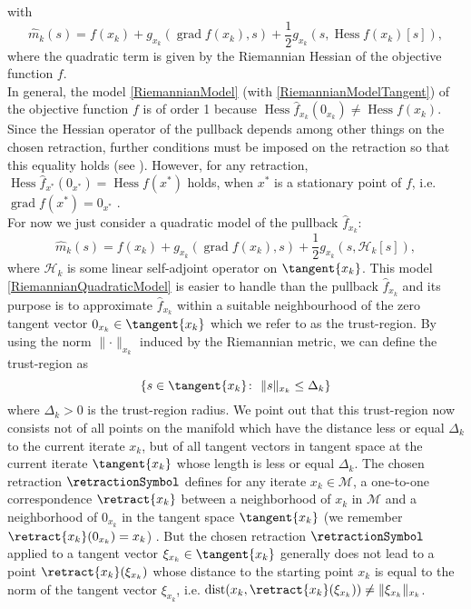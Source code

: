 with
\begin{equation}\label{RiemannianModelTangent}
    \hat{m}_k( s ) = f(x_k) + g_{x_k}(\operatorname{grad} f(x_k), s ) + \frac{1}{2} g_{x_k}( s, \operatorname{Hess} f(x_k) [s]),
\end{equation}
where the quadratic term is given by the Riemannian Hessian of the objective function $f$. \\
In general, the model \cref{RiemannianModel} (with \cref{RiemannianModelTangent}) of the objective function $f$ is of order 1 because $\operatorname{Hess} \hat{f}_{x_k}(0_{x_k}) \neq \operatorname{Hess} f(x_k)$. Since the Hessian operator of the pullback depends among other things on the chosen retraction, further conditions must be imposed on the retraction so that this equality holds (see \cite[Proposition~5.5.5]{AbsilMahonySepulchre:2008}). However, for any retraction, $\operatorname{Hess} \hat{f}_{x^*}(0_{x^*}) = \operatorname{Hess} f(x^*)$ holds, when $x^*$ is a stationary point of $f$, i.e. $\operatorname{grad} f(x^*) = 0_{x^*}$ \cite[p.~138-139]{AbsilMahonySepulchre:2008}. \\
For now we just consider a quadratic model of the pullback $\hat{f}_{x_k}$:
\begin{equation}\label{RiemannianQuadraticModel}
    \hat{m}_k( s ) = f(x_k) + g_{x_k}(\operatorname{grad} f(x_k), s) + \frac{1}{2} g_{x_k}( s, \mathcal{H}_k [s]),
\end{equation}
where $\mathcal{H}_k$ is some linear self-adjoint operator on $\tangent{x_k}$. This model \cref{RiemannianQuadraticModel} is easier to handle than the pullback $\hat{f}_{x_k}$ and its purpose is to approximate $\hat{f}_{x_k}$ within a suitable neighbourhood of the zero tangent vector $0_{x_k} \in \tangent{x_k}$ which we refer to as the trust-region. By using the norm $\lVert \cdot \rVert_{x_k}$ induced by the Riemannian metric, we can define the trust-region as 
\begin{equation}\label{RiemannianTrustRegion}
    \{ s \in \tangent{x_k} \colon \ \lVert s \rVert_{x_k} \leq \Delta_k \}
\end{equation}
where $\Delta_k > 0$ is the trust-region radius. We point out that this trust-region now consists not of all points on the manifold which have the distance less or equal $\Delta_k$ to the current iterate $x_k$, but of all tangent vectors in tangent space at the current iterate $\tangent{x_k}$ whose length is less or equal $\Delta_k$. The chosen retraction $\retractionSymbol$ defines for any iterate $x_k \in \mathcal{M}$, a one-to-one correspondence $\retract{x_k}$ between a neighborhood of $x_k$ in $\mathcal{M}$ and a neighborhood of $0_{x_k}$ in the tangent space $\tangent{x_k}$ (we remember $\retract{x_k}(0_{x_k}) = x_k$) \cite[p.~304]{AbsilBakerGallivan:2007}. But the chosen retraction $\retractionSymbol$ applied to a tangent vector $\xi_{x_k} \in \tangent{x_k}$ generally does not lead to a point $\retract{x_k}(\xi_{x_k})$ whose distance to the starting point $x_k$ is equal to the norm of the tangent vector $\xi_{x_k}$, i.e. $\operatorname{dist}(x_k, \retract{x_k}(\xi_{x_k})) \neq \lVert \xi_{x_k} \rVert_{x_k}$. \\

